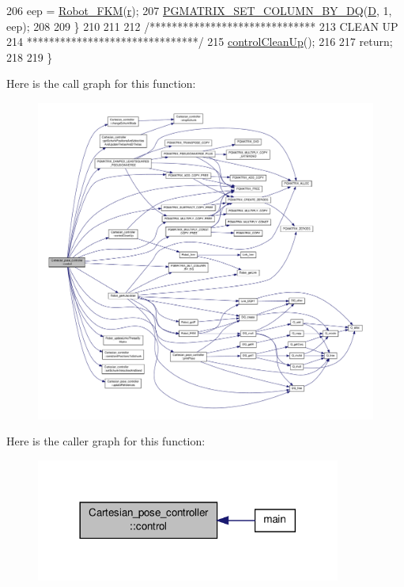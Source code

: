 \begin{DoxyCode}
206                 eep = \hyperlink{robot_8h_a57cc252fbb9e4c8be955b6af755b0c2c}{Robot\_FKM}(\hyperlink{classCartesian__controller_a5562129951bd802e4ded77fc716c87a0}{r});
207                 \hyperlink{dualquaternion_8h_a3d48348c3e25d1724058c2cf2364e42e}{PGMATRIX\_SET\_COLUMN\_BY\_DQ}(\hyperlink{classCartesian__controller_a8c470b652ce436d8e48f126073fc2593}{D}, 1, eep);
208 
209         \}
210 
211 
212         \textcolor{comment}{/******************************}
213 \textcolor{comment}{                        CLEAN UP}
214 \textcolor{comment}{        *******************************/}
215         \hyperlink{classCartesian__controller_a8c0f0b41de9f4f8b2e3aa327e7c6b50c}{controlCleanUp}();
216 
217         \textcolor{keywordflow}{return};
218 
219 \}
\end{DoxyCode}


Here is the call graph for this function\-:\nopagebreak
\begin{figure}[H]
\begin{center}
\leavevmode
\includegraphics[width=350pt]{classCartesian__pose__controller_ab937d166862f2756eb3d08f37a0a090d_cgraph}
\end{center}
\end{figure}




Here is the caller graph for this function\-:\nopagebreak
\begin{figure}[H]
\begin{center}
\leavevmode
\includegraphics[width=284pt]{classCartesian__pose__controller_ab937d166862f2756eb3d08f37a0a090d_icgraph}
\end{center}
\end{figure}


